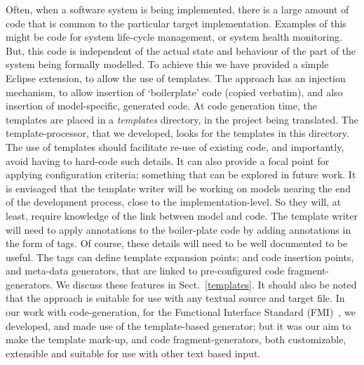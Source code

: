 \documentclass{llncs}%
\begin{document}
Often, when a software system is being implemented, there is a large amount of code that is common to the particular target implementation. Examples of this might be code for system life-cycle management, or system health monitoring. But, this code is independent of the actual state and behaviour of the part of the system being formally modelled. To achieve this we have provided a simple Eclipse extension, to allow the use of templates. The approach has an injection mechanism, to allow insertion of  `boilerplate' code (copied verbatim), and also insertion of model-specific, generated code. At code generation time, the templates are placed in a \emph{templates} directory, in the project being translated. The template-processor, that we developed, looks for the templates in this directory. The use of templates should facilitate re-use of existing code, and importantly, avoid having to hard-code such details. It can also provide a focal point for applying configuration criteria; something that can be explored in future work. It is envisaged that the template writer will be working on models nearing the end of the development process, close to the implementation-level. So they will, at least, require knowledge of the link between model and code. The template writer will need to apply annotations to the boiler-plate code by adding annotations in the form of tags. Of course, these details will need to be well documented to be useful. The tags can define template expansion points; and code insertion points, and meta-data generators, that are linked to pre-configured code fragment-generators. We discuss these features in Sect.~\ref{templates}. It should also be noted that the approach is suitable for use with any textual source and target file. In our work with code-generation, for the Functional Interface Standard (FMI)~\cite{bloch2012,bloch2011,FMISTD}, we developed, and made use of the template-based generator; but it was our aim to make the template mark-up, and code fragment-generators, both customizable, extensible and suitable for use with other text based input.
%
%
\end{document}

